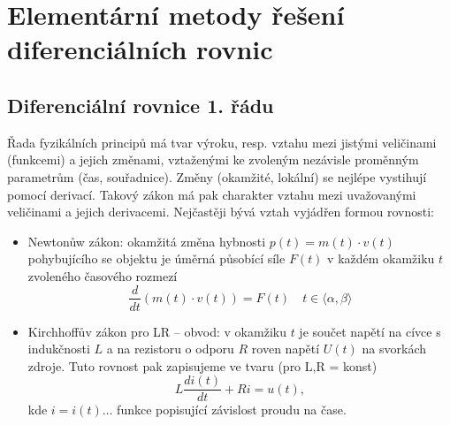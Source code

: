 \graphicspath{{../src/MAI/img/}} 
\chapter{Elementární metody řešení diferenciálních rovnic}
\minitoc
\newpage
  \section{Diferenciální rovnice 1. řádu}
    Řada fyzikálních principů má tvar výroku, resp. vztahu mezi jistými veličinami (funkcemi) a
    jejich změnami, vztaženými ke zvoleným nezávisle proměnným pa\-ra\-me\-trům (čas, souřadnice).
    Změny (okamžité, lokální) se nejlépe vystihují pomocí derivací. Takový zákon má pak charakter
    vztahu mezi uvažovanými veličinami a jejich derivacemi. Nejčastěji bývá vztah vyjádřen formou
    rovnosti:
    \begin{itemize}
   	  \item Newtonůw zákon: okamžitá změna hybnosti $p(t) = m(t)\cdot v(t)$ pohybujícího se
         	objektu je úměrná působící síle $F(t)$ v každém okamžiku $t$ zvoleného časového rozmezí
        	$$\frac{d}{dt}\left(m(t)\cdot v(t)\right) = F(t)\quad t\in\langle\alpha, \beta\rangle$$
      \item Kirchhoffův zákon pro LR – obvod: v okamžiku $t$ je součet napětí na cívce s indukčnosti
            $L$ a na rezistoru o odporu $R$ roven napětí $U(t)$ na svorkách zdroje. Tuto rovnost pak
            zapisujeme ve tvaru (pro L,R = konst)
            \begin{equation}
              L\frac{di(t)}{dt}+Ri=u(t), 
            \end{equation}
            kde $i=i(t)\ldots$ funkce popisující závislost proudu na čase.
    \end{itemize}
    
